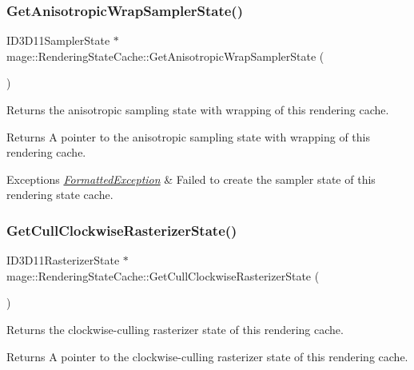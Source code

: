 \subsubsection{\texorpdfstring{Get\+Anisotropic\+Wrap\+Sampler\+State()}{GetAnisotropicWrapSamplerState()}}
{\footnotesize\ttfamily I\+D3\+D11\+Sampler\+State $\ast$ mage\+::\+Rendering\+State\+Cache\+::\+Get\+Anisotropic\+Wrap\+Sampler\+State (\begin{DoxyParamCaption}{ }\end{DoxyParamCaption})}

Returns the anisotropic sampling state with wrapping of this rendering cache.

\begin{DoxyReturn}{Returns}
A pointer to the anisotropic sampling state with wrapping of this rendering cache. 
\end{DoxyReturn}

\begin{DoxyExceptions}{Exceptions}
{\em \hyperlink{structmage_1_1_formatted_exception}{Formatted\+Exception}} & Failed to create the sampler state of this rendering state cache. \\
\hline
\end{DoxyExceptions}
\hypertarget{structmage_1_1_rendering_state_cache_a4055aaf84813811b94ed741c07cbee3c}{}\label{structmage_1_1_rendering_state_cache_a4055aaf84813811b94ed741c07cbee3c} 
\subsubsection{\texorpdfstring{Get\+Cull\+Clockwise\+Rasterizer\+State()}{GetCullClockwiseRasterizerState()}}
{\footnotesize\ttfamily I\+D3\+D11\+Rasterizer\+State $\ast$ mage\+::\+Rendering\+State\+Cache\+::\+Get\+Cull\+Clockwise\+Rasterizer\+State (\begin{DoxyParamCaption}{ }\end{DoxyParamCaption})}

Returns the clockwise-\/culling rasterizer state of this rendering cache.

\begin{DoxyReturn}{Returns}
A pointer to the clockwise-\/culling rasterizer state of this rendering cache. 
\end{DoxyReturn}

